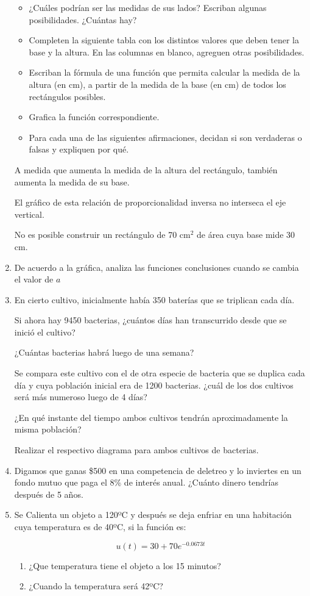 \documentclass[12pt,a4paper]{article}
\begin{document}
\begin{enumerate}
\begin{itemize}
\item ¿Cuáles podrían ser las medidas de sus lados? Escriban algunas posibilidades. ¿Cuántas hay?
\item Completen la siguiente tabla con los distintos valores que deben tener la base y la altura. En las columnas en blanco, agreguen otras posibilidades.
\item Escriban la fórmula de una función que permita calcular la medida de la altura (en cm), a partir de la medida de la base (en cm) de todos los rectángulos posibles.
\item Grafica la función correspondiente.
\item Para cada una de las siguientes afirmaciones, decidan si son verdaderas o falsas y expliquen por qué.
\end{itemize}

A medida que aumenta la medida de la altura del rectángulo, también aumenta la medida de su base.

El gráfico de esta relación de proporcionalidad inversa no interseca el eje vertical.

No es posible construir un rectángulo de 70 cm$^2$ de área cuya base mide 30 cm.

\item De acuerdo a la gráfica, analiza las funciones conclusiones cuando se cambia el valor de $a$

\item En cierto cultivo, inicialmente había 350 baterías que se triplican cada día.

Si ahora hay 9450 bacterias, ¿cuántos días han transcurrido desde que se inició el cultivo?

¿Cuántas bacterias habrá luego de una semana?

Se compara este cultivo con el de otra especie de bacteria que se duplica cada día y cuya población inicial era de 1200 bacterias. ¿cuál de los dos cultivos será más numeroso luego de 4 días?

¿En qué instante del tiempo ambos cultivos tendrán aproximadamente la misma población?

Realizar el respectivo diagrama para ambos cultivos de bacterias.

\item Digamos que ganas \$500 en una competencia de deletreo y lo inviertes en un fondo mutuo que paga el 8\% de interés anual. ¿Cuánto dinero tendrías después de 5 años.

\item Se Calienta un objeto a 120ºC y después se deja enfriar en una habitación cuya temperatura es de 40ºC, si la función es:

$$u(t) = 30 + 70e^{-0.0673t}$$

\begin{enumerate}[label=\alph*.]
\item ¿Que temperatura tiene el objeto a los 15 minutos?
\item ¿Cuando la temperatura será 42ºC?
\end{enumerate}

\end{enumerate}
\end{document}
